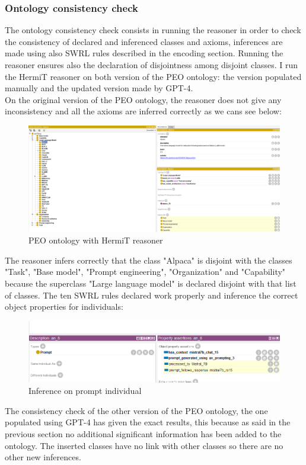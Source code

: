 \subsubsection{Ontology consistency check}
The ontology consistency check consists in running the reasoner in order to check the consistency of declared and inferenced classes and axioms, inferences are made using also SWRL rules described in the encoding section. Running the reasoner ensures also the declaration of disjointness among disjoint classes. I run the HermiT reasoner on both version of the PEO ontology: the version populated manually and the updated version made by GPT-4.\\
On the original version of the PEO ontology, the reasoner does not give any inconsistency and all the axioms are inferred correctly as we cans see below:
\begin{figure}[H]
    \centering
    \includegraphics[width=0.9\linewidth]{Figures/fig_39.png}
    \caption{PEO ontology with HermiT reasoner}
    \label{fig:enter-label}
\end{figure}
The reasoner infers correctly that the class "Alpaca" is disjoint with the classes "Task", "Base model", "Prompt engineering", "Organization" and "Capability" because the superclass "Large language model" is declared disjoint with that list of classes. The ten SWRL rules declared work properly and inference the correct object properties for individuals:
\begin{figure}[H]
    \centering
    \includegraphics[width=0.9\linewidth]{Figures/fig_40.png}
    \caption{Inference on prompt individual}
    \label{fig:enter-label}
\end{figure}
The consistency check of the other version of the PEO ontology, the one populated using GPT-4 has given the exact results, this because as said in the previous section no additional significant information has been added to the ontology. The inserted classes have no link with other classes so there are no other new inferences.

